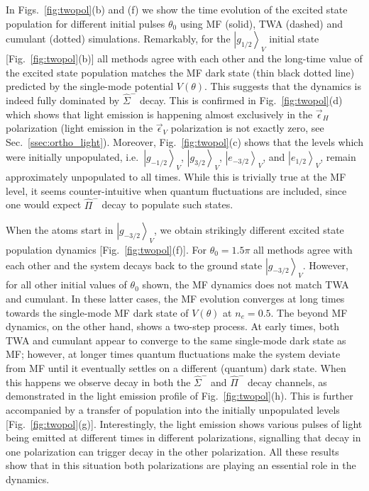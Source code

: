 \documentclass[aps,prx,superscriptaddress,twocolumn,notitlepage,nofootinbib,longbibliography]{revtex4-2}
\newcommand{\ket}[1]{\left|#1\right>}
\begin{document}
In Figs.~\ref{fig:twopol}(b) and (f) we show the time evolution of the excited state population for different initial pulses $\theta_0$ using MF (solid), TWA (dashed) and cumulant (dotted) simulations. Remarkably, for the $\ket{g_{1/2}}_V$ initial state [Fig.~\ref{fig:twopol}(b)] all methods agree with each other and the long-time value of the excited state population matches the MF dark state (thin black dotted line) predicted by the single-mode potential $V(\theta)$. This suggests that the dynamics is indeed fully dominated by $\hat{\Sigma}^-$ decay. This is confirmed in Fig.~\ref{fig:twopol}(d) which shows that light emission is happening almost exclusively in the $\vec{\epsilon}_H$ polarization (light emission in the $\vec{\epsilon}_V$ polarization is not exactly zero, see Sec.~\ref{ssec:ortho_light}). Moreover, Fig.~\ref{fig:twopol}(c) shows that the levels which were initially unpopulated, i.e.~$\ket{g_{-1/2}}_V$, $\ket{g_{3/2}}_V$, $\ket{e_{-3/2}}_V$, and $\ket{e_{1/2}}_V$, remain approximately unpopulated to all times. While this is trivially true at the MF level, it seems counter-intuitive when quantum fluctuations are included, since one would expect $\hat{\Pi}^-$ decay to populate such states.

When the atoms start in $\ket{g_{-3/2}}_V$, we obtain strikingly different excited state population dynamics [Fig.~\ref{fig:twopol}(f)]. For $\theta_0=1.5\pi$ all methods agree with each other and the system decays back to the ground state $\ket{g_{-3/2}}_V$. However, for all other initial values of $\theta_0$ shown, the MF dynamics does not match TWA and cumulant.
In these latter cases, the MF evolution converges at long times towards the single-mode MF dark state of $V(\theta)$ at $n_e=0.5$. The beyond MF dynamics, on the other hand, shows a two-step process. At early times, both TWA and cumulant appear to converge to the same single-mode dark state as MF; however, at longer times quantum fluctuations make the system deviate from MF until it eventually settles on a different (quantum) dark state.
When this happens we observe decay in both the $\hat{\Sigma}^-$ and $\hat{\Pi}^-$ decay channels, as demonstrated in the light emission profile of Fig.~\ref{fig:twopol}(h). This is further accompanied by a transfer of population into the initially unpopulated levels [Fig.~\ref{fig:twopol}(g)]. Interestingly, the light emission shows various pulses of light being emitted at different times in different polarizations, signalling that decay in one polarization can trigger decay in the other polarization.
All these results show that in this situation both polarizations are playing an essential role in the dynamics.
\end{document}
